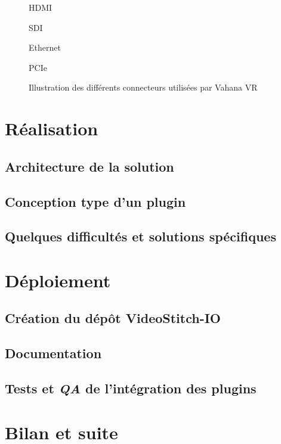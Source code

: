 \begin{figure}
  \centering
  \begin{minipage}[t]{0.2\textwidth}
    \centering
    \caption{HDMI}
  \end{minipage}%
  \hspace{0.03\textwidth}
  \begin{minipage}[t]{0.2\textwidth}
    \centering
    \caption{SDI}
  \end{minipage}%
  \hspace{0.03\textwidth}
  \begin{minipage}[t]{0.2\textwidth}
    \centering
    \caption{Ethernet}
  \end{minipage}%
  \hspace{0.03\textwidth}
  \begin{minipage}[t]{0.2\textwidth}
    \centering
    \caption{PCIe}
  \end{minipage}
  \caption{Illustration des différents connecteurs utilisées par Vahana VR}
\end{figure}

\section{Réalisation}
\subsection{Architecture de la solution}

\subsection{Conception type d'un plugin}

\subsection{Quelques difficultés et solutions spécifiques}


\section{Déploiement}
\subsection{Création du dépôt VideoStitch-IO}

\subsection{Documentation}

\subsection{Tests et \textit{QA} de l'intégration des plugins}


\section{Bilan et suite}

